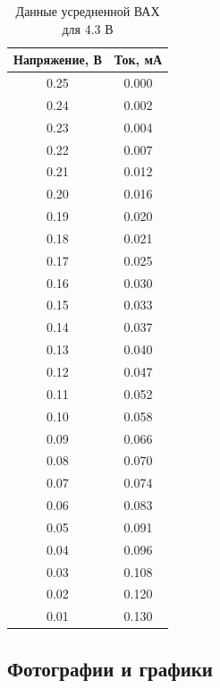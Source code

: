 \begin{table}[!ht]
\centering
\caption{Данные усредненной ВАХ для 4.3 В}
\begin{tabular}{|c|c|}
\hline
Напряжение, В & Ток, мА \\ \hline
0.25          & 0.000   \\ \hline
0.24          & 0.002   \\ \hline
0.23          & 0.004   \\ \hline
0.22          & 0.007   \\ \hline
0.21          & 0.012   \\ \hline
0.20          & 0.016   \\ \hline
0.19          & 0.020   \\ \hline
0.18          & 0.021   \\ \hline
0.17          & 0.025   \\ \hline
0.16          & 0.030   \\ \hline
0.15          & 0.033   \\ \hline
0.14          & 0.037   \\ \hline
0.13          & 0.040   \\ \hline
0.12          & 0.047   \\ \hline
0.11          & 0.052   \\ \hline
0.10          & 0.058   \\ \hline
0.09          & 0.066   \\ \hline
0.08          & 0.070   \\ \hline
0.07          & 0.074   \\ \hline
0.06          & 0.083   \\ \hline
0.05          & 0.091   \\ \hline
0.04          & 0.096   \\ \hline
0.03          & 0.108   \\ \hline
0.02          & 0.120   \\ \hline
0.01          & 0.130   \\ \hline
\end{tabular}
\label{tab:data}
\end{table}


\newpage
\subsection{Фотографии и графики}

